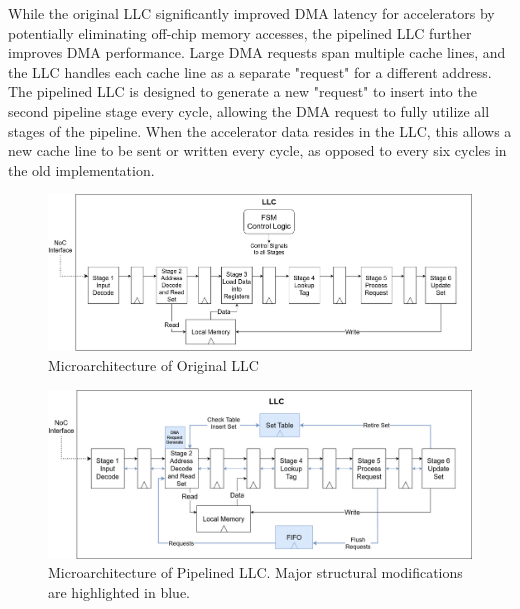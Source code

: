 \par While the original LLC significantly improved DMA latency for accelerators
by potentially eliminating off-chip memory accesses, the pipelined LLC
further improves DMA performance. Large DMA requests span multiple
cache lines, and the LLC handles each cache line as a separate
"request" for a different address. The pipelined LLC is designed to generate a
new "request" to insert into the second pipeline stage every cycle, allowing
the DMA request to fully utilize all stages of the pipeline. When the accelerator
data resides in the LLC, this allows a new cache line to be sent or written every
cycle, as opposed to every six cycles in the old implementation.


\begin{figure}[t]
    \centering
    \captionsetup{justification=centering, format=hang}
    \includegraphics[width=1\textwidth]{fig/LLC_muarc_original.png}
    \caption{Microarchitecture of Original LLC}
    \label{fig:original_muarc}
    \end{figure}

\begin{figure}[t]
    \centering
    \captionsetup{justification=centering, format=hang}
    \includegraphics[width=1\textwidth]{fig/LLC_muarc_pipeline2.png}
    \caption{Microarchitecture of Pipelined LLC. Major structural modifications are highlighted in blue.}
    \label{fig:pipeline_muarc}
    \end{figure}
  
  
